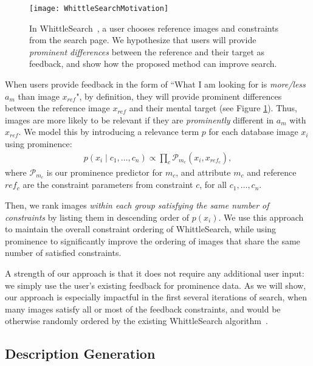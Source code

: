 \documentclass[10pt,twocolumn,letterpaper]{article}
\begin{document}
\begin{figure}
    \centering
    \texttt{[image: WhittleSearchMotivation]}
    
    \caption[WhittleSearch Relative Attribute Feedback]{In WhittleSearch~\cite{whittlesearch, whittlesearch2}, a user chooses reference images and constraints from the search page. We hypothesize that users will provide \textit{prominent differences} between the reference and their target as feedback, and show how the proposed method can improve search.}
    \label{fig:whittlesearchmotivation}
\end{figure}

When users provide feedback in the form of ``What I am looking for is \textit{more/less} $a_m$ than image $x_{ref}$", by definition, they will provide prominent differences between the reference image $x_{ref}$ and their mental target (see Figure \ref{fig:whittlesearchmotivation}). Thus, images are more likely to be relevant if they are \textit{prominently} different in $a_m$ with $x_{ref}$. We model this by introducing a relevance term $p$ for each database image $x_i$ using prominence:
\begin{align}
    p(x_i \mid c_1, \dotsc, c_n) \propto \prod_{c} \mathcal{P}_{m_c}(x_i, x_{ref_c}),
\end{align}
where $\mathcal{P}_{m_c}$ is our prominence predictor for $m_c$, and attribute $m_c$ and reference $ref_c$ are the constraint parameters from constraint $c$, for all $c_1, \dotsc, c_n$.

Then, we rank images \textit{within each group satisfying the same number of constraints} by listing them in descending order of $p(x_i)$. We use this approach to maintain the overall constraint ordering of WhittleSearch, while using prominence to significantly improve the ordering of images that share the same number of satisfied constraints. 

A strength of our approach is that it does not require any additional user input: we simply use the user's existing feedback for prominence data. As we will show, our approach is especially impactful in the first several iterations of search, when many images satisfy all or most of the feedback constraints, and would be otherwise randomly ordered by the existing WhittleSearch algorithm~\cite{whittlesearch}.

\subsection{Description Generation} \label{descriptiongeneration}
\end{document}
